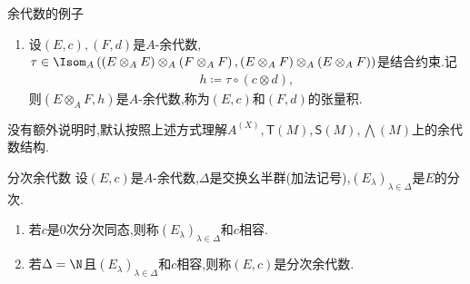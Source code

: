 \begin{example}{余代数的例子}{}
\begin{enumerate}
\begin{gather*}
		\end{gather*}
		这是$\bigwedge\left(M\right)\otimes_{A}^{g}\bigwedge\left(M\right)$上全次数为$n$的元素,它的双次数为$\left(p,n-p\right)$($p\in\left[1,n-1\right]$)的齐次分量是
		\begin{align*}
			\sum\limits_{\sigma\in\Shuffle_{p,n-p}}\sign\left(\sigma\right)\left(x_{\sigma\left(1\right)}\wedge\ldots \wedge x_{\sigma\left(p\right)}\right)\otimes\left(x_{\sigma\left(p+1\right)}\wedge\ldots\wedge x_{\sigma\left(n\right)}\right).
		\end{align*}
		\item 设$\left(E,c\right),\left(F,d\right)$是$A$-余代数,$\tau\in\Isom_{A}\left(\left(E\otimes_{A}E\right)\otimes_{A}\left(F\otimes_{A}F\right),\left(E\otimes_{A}F\right)\otimes_{A}\left(E\otimes_{A}F\right)\right)$是结合约束.记
		\begin{align*}
			h\coloneq\tau\circ\left(c\otimes d\right),
		\end{align*}
		则$\left(E\otimes_{A}F,h\right)$是$A$-余代数,称为$\left(E,c\right)$和$\left(F,d\right)$的张量积.
	\end{enumerate}
	没有额外说明时,默认按照上述方式理解$A^{\left(X\right)},\mathsf{T}\left(M\right),\mathsf{S}\left(M\right),\bigwedge\left(M\right)$上的余代数结构.
\end{example}

\begin{definition}{分次余代数}{}
	设$\left(E,c\right)$是$A$-余代数,$\Delta$是交换幺半群(加法记号),$\left(E_{\lambda}\right)_{\lambda\in\Delta}$是$E$的分次.
	\begin{enumerate}
		\item 若$c$是$0$次分次同态,则称$\left(E_{\lambda}\right)_{\lambda\in\Delta}$和$c$相容.
		\item 若$\Delta=\N$且$\left(E_{\lambda}\right)_{\lambda\in\Delta}$和$c$相容,则称$\left(E,c\right)$是分次余代数.
	\end{enumerate}
\end{definition}

